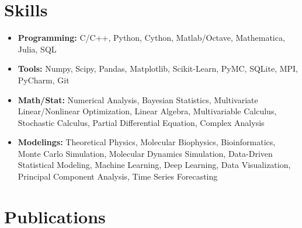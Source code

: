 \documentclass[11pt]{../yhlcv}
\begin{document}
\section*{Skills}
\begin{itemize}[leftmargin=*]\itemsep-0.1em
%
\item{\bf Programming:} 
C/C++, Python, Cython, Matlab/Octave, Mathematica, Julia, SQL
%
\item{\bf Tools:}
Numpy, Scipy, Pandas, Matplotlib, Scikit-Learn, PyMC, SQLite, MPI, PyCharm, Git

%
\item {\bf Math/Stat:}
Numerical Analysis, 
Bayesian Statistics, 
Multivariate Linear/Nonlinear Optimization, 
Linear Algebra, 
Multivariable Calculus,
Stochastic Calculus,
Partial Differential Equation, 
Complex Analysis %
\item{\bf Modelings:}
Theoretical Physics, Molecular Biophysics, Bioinformatics,
Monte Carlo Simulation, Molecular Dynamics Simulation, %
Data-Driven Statistical Modeling,
Machine Learning,
Deep Learning, %
Data Visualization, 
Principal Component Analysis, 
Time Series Forecasting
%
\end{itemize}

\section*{Publications}
\end{document}
